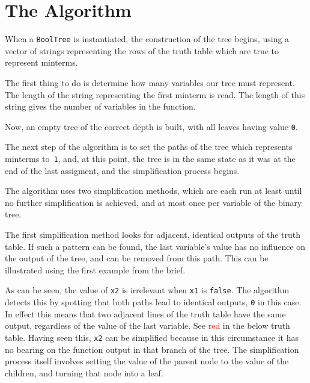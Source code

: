 \documentclass[12pt]{article}
\begin{document}
    \section{The Algorithm}
    
    When a \texttt{BoolTree} is instantiated, the construction of the tree begins, using a vector of strings representing the rows of the truth table which are true to represent minterms.

    The first thing to do is determine how many variables our tree must represent. The length of the string representing the first minterm is read. The length of this string gives the number of variables in the function.
    
    Now, an empty tree of the correct depth is built, with all leaves having value \texttt{0}.

    The next step of the algorithm is to set the paths of the tree which represents minterms to~\texttt{1}, and, at this point, the tree is in the same state as it was at the end of the last assigment, and the simplification process begins.

    The algorithm uses two simplification methods, which are each run at least until no further simplification is achieved, and at most once per variable of the binary tree.

    The first simplification method looks for adjacent, identical outputs of the truth table. If such a pattern can be found, the last variable's value has no influence on the output of the tree, and can be removed from this path. This can be illustrated using the first example from the brief.

    \pagebreak

    As can be seen, the value of \texttt{x2} is irrelevant when \texttt{x1} is \texttt{false}. The algorithm detects this by spotting that both paths lead to identical outputs, \texttt{0} in this case.
    In effect this means that two adjacent lines of the truth table have the same output, regardless of the value of the last variable. See \textcolor{red}{red} in the below truth table. Having seen this, \texttt{x2} can be simplified because in this circumstance it has no bearing on the function output in that branch of the tree. The simplification process itself involves setting the value of the parent node to the value of the children, and turning that node into a leaf.
\end{document}
